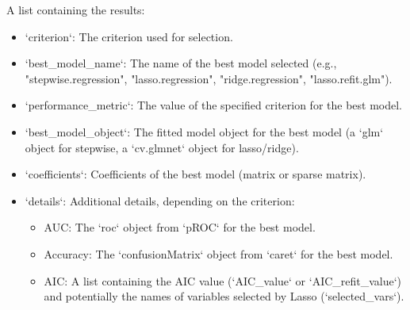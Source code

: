 \documentclass[a4paper]{book}
\begin{document}
\begin{Value}
A list containing the results:
\begin{itemize}

\item{} `criterion`: The criterion used for selection.
\item{} `best\_model\_name`: The name of the best model selected
(e.g., "stepwise.regression", "lasso.regression", "ridge.regression", "lasso.refit.glm").
\item{} `performance\_metric`: The value of the specified criterion for the best model.
\item{} `best\_model\_object`: The fitted model object for the best model
(a `glm` object for stepwise, a `cv.glmnet` object for lasso/ridge).
\item{} `coefficients`: Coefficients of the best model (matrix or sparse matrix).
\item{} `details`: Additional details, depending on the criterion:
\begin{itemize}

\item{} AUC: The `roc` object from `pROC` for the best model.
\item{} Accuracy: The `confusionMatrix` object from `caret` for the best model.
\item{} AIC: A list containing the AIC value (`AIC\_value` or `AIC\_refit\_value`)
and potentially the names of variables selected by Lasso (`selected\_vars`).

\end{itemize}


\end{itemize}

\end{Value}
%
\end{document}
